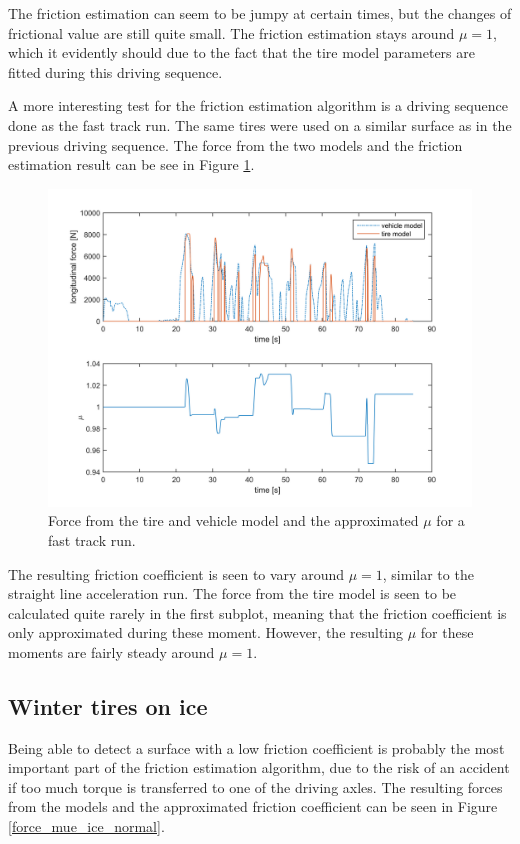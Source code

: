 The friction estimation can seem to be jumpy at certain times, but the changes of frictional value are still quite small. The friction estimation stays around $ \mu = 1 $, which it evidently should due to the fact that the tire model parameters are fitted during this driving sequence.  

A more interesting test for the friction estimation algorithm is a driving sequence done as the fast track run. The same tires were used on a similar surface as in the previous driving sequence. The force from the two models and the friction estimation result can be see in Figure \ref{force_mue_race}. 

\begin{figure}[h]
	\centering
	\includegraphics[width=1.0\textwidth]{Pictures/force_mue_race}
	\caption {Force from the tire and vehicle model and the approximated $ \mu $ for a fast track run.}
	\label{force_mue_race}
\end{figure}

The resulting friction coefficient is seen to vary around $ \mu = 1 $, similar to the straight line acceleration run. The force from the tire model is seen to be calculated quite rarely in the first subplot, meaning that the friction coefficient is only approximated during these moment. However, the resulting $ \mu $ for these moments are fairly steady around $ \mu = 1 $. 

\subsection{Winter tires on ice}
Being able to detect a surface with a low friction coefficient is probably the most important part of the friction estimation algorithm, due to the risk of an accident if too much torque is transferred to one of the driving axles. The resulting forces from the models and the approximated friction coefficient can be seen in Figure \ref{force_mue_ice_normal}.

